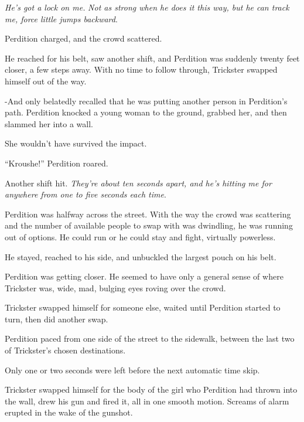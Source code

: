 \emph{He's got a lock on me.  }\emph{Not as strong when he does it this way, but he can track me, force little jumps backward}.



Perdition charged, and the crowd scattered.



He reached for his belt, saw another shift, and Perdition was suddenly twenty feet closer, a few steps away.  With no time to follow through, Trickster swapped himself out of the way.



-And only belatedly recalled that he was putting another person in Perdition's path.  Perdition knocked a young woman to the ground, grabbed her, and then slammed her into a wall.



She wouldn't have survived the impact.



``Kroushe!'' Perdition roared.



Another shift hit.  \emph{They're about ten seconds apart, and he's hitting me for anywhere from one to five seconds each time}.



Perdition was halfway across the street.  With the way the crowd was scattering and the number of available people to swap with was dwindling, he was running out of options.  He could run or he could stay and fight, virtually powerless.



He stayed, reached to his side, and unbuckled the largest pouch on his belt.



Perdition was getting closer.  He seemed to have only a general sense of where Trickster was, wide, mad, bulging eyes roving over the crowd.



Trickster swapped himself for someone else, waited until Perdition started to turn, then did another swap.



Perdition paced from one side of the street to the sidewalk, between the last two of Trickster's chosen destinations.



Only one or two seconds were left before the next automatic time skip.



Trickster swapped himself for the body of the girl who Perdition had thrown into the wall, drew his gun and fired it, all in one smooth motion.  Screams of alarm erupted in the wake of the gunshot.



